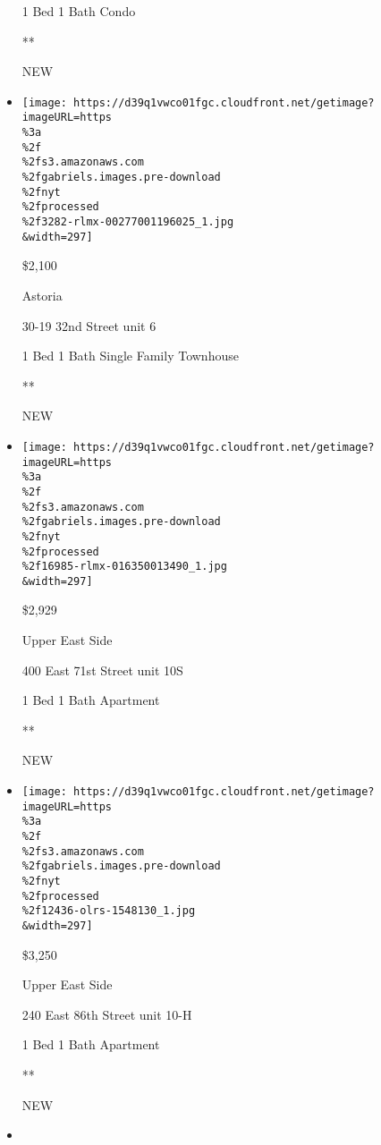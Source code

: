 \begin{itemize}
  1 Bed \textbar{} 1 Bath \textbar{} Condo

  **

  NEW
\item
  \href{/real-estate/usa/ny/queens/astoria/homes-for-rent/30-19-32nd-street/3282-RLMX-00277001196025?}{}

  \texttt{[image: https://d39q1vwco01fgc.cloudfront.net/getimage?imageURL=https\\\%3a\\\%2f\\\%2fs3.amazonaws.com\\\%2fgabriels.images.pre-download\\\%2fnyt\\\%2fprocessed\\\%2f3282-rlmx-00277001196025\_1.jpg\\\&width=297]}

  \$2,100

  Astoria

  30-19 32nd Street unit 6

  1 Bed \textbar{} 1 Bath \textbar{} Single Family Townhouse

  **

  NEW
\item
  \href{/real-estate/usa/ny/new-york/upper-east-side/homes-for-rent/400-east-71st-street/16985-RLMX-016350013490?}{}

  \texttt{[image: https://d39q1vwco01fgc.cloudfront.net/getimage?imageURL=https\\\%3a\\\%2f\\\%2fs3.amazonaws.com\\\%2fgabriels.images.pre-download\\\%2fnyt\\\%2fprocessed\\\%2f16985-rlmx-016350013490\_1.jpg\\\&width=297]}

  \$2,929

  Upper East Side

  400 East 71st Street unit 10S

  1 Bed \textbar{} 1 Bath \textbar{} Apartment

  **

  NEW
\item
  \href{/real-estate/usa/ny/new-york/upper-east-side/homes-for-rent/240-east-86th-street/12436-OLRS-1548130?}{}

  \texttt{[image: https://d39q1vwco01fgc.cloudfront.net/getimage?imageURL=https\\\%3a\\\%2f\\\%2fs3.amazonaws.com\\\%2fgabriels.images.pre-download\\\%2fnyt\\\%2fprocessed\\\%2f12436-olrs-1548130\_1.jpg\\\&width=297]}

  \$3,250

  Upper East Side

  240 East 86th Street unit 10-H

  1 Bed \textbar{} 1 Bath \textbar{} Apartment

  **

  NEW
\item
  \href{/real-estate/usa/ny/new-york/west-village/homes-for-rent/223-west-10th-street/737-OLRS-1889749?}{}


\end{itemize}
